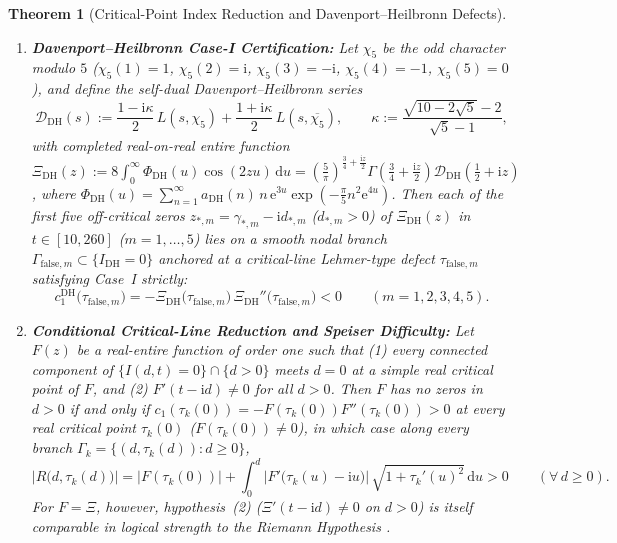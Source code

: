 \documentclass[11pt,reqno]{amsart}
\newtheorem{theorem}{Theorem}[section]
\theoremstyle{definition}
\theoremstyle{remark}
\numberwithin{equation}{section}
\newcommand{\dd}{\mathrm{d}}
\newcommand{\ii}{\mathrm{i}}
\newcommand{\ee}{\mathrm{e}}
\newcommand{\DHf}{\mathrm{DH}}
\begin{document}
\begin{theorem}[Critical-Point Index Reduction and Davenport--Heilbronn Defects]\label{thm:index-and-dh}
\begin{enumerate}[label=\upshape(\alph*),leftmargin=2.2em]
\item \textbf{Davenport--Heilbronn Case-I Certification:} Let $\chi_5$ be the odd character modulo $5$ ($\chi_5(1)=1$, $\chi_5(2)=\ii$, $\chi_5(3)=-\ii$, $\chi_5(4)=-1$, $\chi_5(5)=0$), and define the self-dual Davenport--Heilbronn series \cite{DavenportHeilbronn1936,Titchmarsh1986}
\begin{equation}\label{eq:Xi-DH-def}
\mathcal{D}_{\DHf}(s) := \frac{1 - \ii\kappa}{2}\,L(s,\chi_5) + \frac{1 + \ii\kappa}{2}\,L(s,\overline{\chi_5}), \qquad \kappa := \frac{\sqrt{10 - 2\sqrt{5}} - 2}{\sqrt{5} - 1},
\end{equation}
with completed real-on-real entire function $\Xi_{\DHf}(z) := 8\int_0^\infty \Phi_{\DHf}(u)\cos(2zu)\,\dd u = (\frac{5}{\pi})^{\frac{3}{4}+\frac{\ii z}{2}}\Gamma(\frac{3}{4}+\frac{\ii z}{2})\mathcal{D}_{\DHf}(\frac{1}{2}+\ii z)$, where $\Phi_{\DHf}(u) = \sum_{n=1}^\infty a_{\DHf}(n)\,n\,\ee^{3u}\exp(-\frac{\pi}{5}n^2\ee^{4u})$. Then each of the first five off-critical zeros $z_{*,m} = \gamma_{*,m} - \ii d_{*,m}$ ($d_{*,m}>0$) of $\Xi_{\DHf}(z)$ in $t \in [10,260]$ ($m=1,\dots,5$) lies on a smooth nodal branch $\Gamma_{\mathrm{false},m} \subset \{I_{\DHf}=0\}$ anchored at a critical-line Lehmer-type defect $\tau_{\mathrm{false},m}$ satisfying Case~I strictly:
\begin{equation}\label{eq:DH-c1-neg}
c_1^{\DHf}\bigl(\tau_{\mathrm{false},m}\bigr) = -\Xi_{\DHf}\bigl(\tau_{\mathrm{false},m}\bigr)\,\Xi_{\DHf}''\bigl(\tau_{\mathrm{false},m}\bigr) < 0 \qquad (m = 1,2,3,4,5).
\end{equation}
\item \textbf{Conditional Critical-Line Reduction and Speiser Difficulty:} Let $F(z)$ be a real-entire function of order one such that (1) every connected component of $\{I(d,t)=0\}\cap\{d>0\}$ meets $d=0$ at a simple real critical point of $F$, and (2) $F'(t-\ii d) \ne 0$ for all $d > 0$. Then $F$ has no zeros in $d>0$ if and only if $c_1(\tau_k(0)) = -F(\tau_k(0))F''(\tau_k(0)) > 0$ at every real critical point $\tau_k(0)$ ($F(\tau_k(0))\ne 0$), in which case along every branch $\Gamma_k = \{(d,\tau_k(d)) : d \ge 0\}$,
\begin{equation}\label{eq:wall-global-floor}
\bigl|R\bigl(d,\tau_k(d)\bigr)\bigr| = \bigl|F(\tau_k(0))\bigr| + \int_0^d \bigl|F'\bigl(\tau_k(u)-\ii u\bigr)\bigr|\,\sqrt{1 + \tau_k'(u)^2}\,\dd u > 0 \qquad (\forall\,d \ge 0).
\end{equation}
For $F = \Xi$, however, hypothesis~(2) ($\Xi'(t-\ii d)\ne 0$ on $d>0$) is itself comparable in logical strength to the Riemann Hypothesis \cite{Jensen1913,Polya1926,Speiser1934,CravenCsordasSmith1987}.
\end{enumerate}
\end{theorem}
\end{document}

